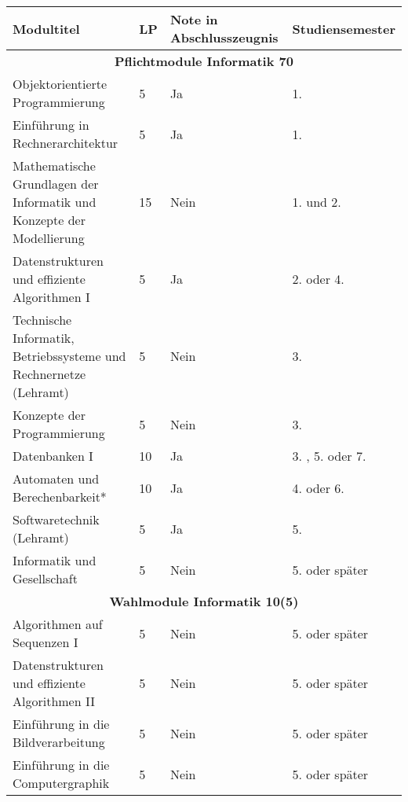 \begin{table}[tbp]
    \begin{footnotesize}
    \begin{tabularx}{\textwidth}{|b{}|X|X|X|}
        \hline
        Modultitel                                                            & LP & Note in Abschlusszeugnis & Studien\-semester \\
        \hline
        \multicolumn{4}{|c|}{\textbf{Pflichtmodule Informatik 70}}\\\hline
        Objektorientierte Programmierung                                      &  5 & Ja   & 1. \\
        Einführung in Rechnerarchitektur                                      &  5 & Ja   & 1. \\
        Mathematische Grundlagen der Informatik und Konzepte der Modellierung & 15 & Nein & 1. und 2. \\
        Datenstrukturen und effiziente Algorithmen I                          &  5 & Ja   & 2. oder 4. \\
        Technische Informatik, Betriebssysteme und Rechnernetze (Lehramt)     &  5 & Nein & 3. \\
        Konzepte der Programmierung                                           &  5 & Nein & 3. \\
        Datenbanken I                                                         & 10 & Ja   & 3. , 5. oder 7. \\
        Automaten und Berechenbarkeit*                                        & 10 & Ja   & 4. oder 6. \\
        Softwaretechnik (Lehramt)                                             &  5 & Ja   & 5. \\
        Informatik und Gesellschaft                                           &  5 & Nein & 5. oder später \\
        \hline
        \multicolumn{4}{|c|}{\textbf{Wahlmodule Informatik 10(5)}}\\\hline
        Algorithmen auf Sequenzen I                      & 5 & Nein & 5. oder später \\
        Datenstrukturen und effiziente Algorithmen II    & 5 & Nein & 5. oder später \\
        Einführung in die Bildverarbeitung               & 5 & Nein & 5. oder später \\
        Einführung in die Computergraphik                & 5 & Nein & 5. oder später \\

\end{tabularx}
\end{footnotesize}
\end{table}
